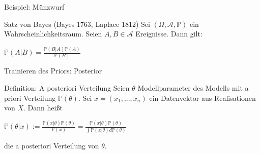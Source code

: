 \documentclass{beamer}
\begin{document}
{\begin{frame}{Beispiel: Münzwurf}
\begin{minipage}{3cm}
	\end{minipage}
\end{frame}




\begin{frame}
	\begin{block}{Satz von Bayes (Bayes 1763, Laplace 1812)}
		Sei $(\Omega, \mathcal{A}, \mathbb{P})$ ein Wahrscheinlichkeitsraum. Seien $A,B \in \mathcal{A}$ Ereignisse. Dann gilt:
		\begin{center}
			$\mathbb{P}(A\vert B) = \frac{\mathbb{P}(B \vert A) \mathbb{P}(A)}{\mathbb{P}(B)}$
		\end{center}
	\end{block}
\end{frame}

\begin{frame}{Trainieren des Priors: Posterior}
	\begin{block}{Definition: A posteriori Verteilung}
	Seien $\theta$ Modellparameter des Modells mit a priori Verteilung $\mathbb{P}(\theta)$. Sei $x=(x_1,...,x_n)$ ein Datenvektor aus Realisationen von $X$. Dann heißt
	\begin{center}
		$\mathbb{P}(\theta\vert x):= \frac{\mathbb{P}(x\vert \theta)\mathbb{P}(\theta)}{\mathbb{P}(x)}=
		\frac{\mathbb{P}(x\vert \theta)\mathbb{P}(\theta)}{\int\mathbb{P}(x\vert \theta)d\mathbb{P}(\theta)}$
	\end{center}
	die a posteriori Verteilung von $\theta$.
	\end{block}
\end{frame}


}
\end{document}
